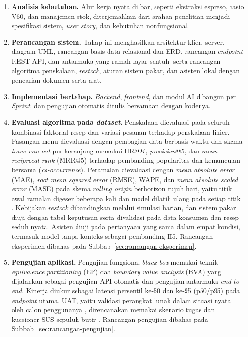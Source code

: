 \begin{enumerate}[label=\arabic*.]
\item \textbf{Analisis kebutuhan.} Alur kerja nyata di bar, seperti ekstraksi espreso, rasio V60, dan manajemen stok, diterjemahkan dari arahan penelitian menjadi spesifikasi sistem, \textit{user story}, dan kebutuhan nonfungsional.
\item \textbf{Perancangan sistem.} Tahap ini menghasilkan arsitektur klien--server, diagram UML, rancangan basis data relasional dan ERD, rancangan \textit{endpoint} REST API, dan antarmuka yang ramah layar sentuh, serta rancangan algoritma penskalaan, \textit{restock}, aturan sistem pakar, dan asisten lokal dengan pencarian dokumen serta alat.
\item \textbf{Implementasi bertahap.} \textit{Backend}, \textit{frontend}, dan modul AI dibangun per \textit{Sprint}, dan pengujian otomatis ditulis bersamaan dengan kodenya.
\item \textbf{Evaluasi algoritma pada \textit{dataset}.} Penskalaan dievaluasi pada seluruh kombinasi faktorial resep dan variasi pesanan terhadap penskalaan linier. Pasangan menu dievaluasi dengan pembagian data berbasis waktu dan skema \textit{leave-one-out} per keranjang memakai HR@$K$, \textit{precision}@5, dan \textit{mean reciprocal rank} (MRR@5) terhadap pembanding popularitas dan kemunculan bersama (\textit{co-occurrence}). Peramalan dievaluasi dengan \textit{mean absolute error} (MAE), \textit{root mean squared error} (RMSE), WAPE, dan \textit{mean absolute scaled error} (MASE) pada skema \textit{rolling origin} berhorizon tujuh hari, yaitu titik awal ramalan digeser beberapa kali dan model dilatih ulang pada setiap titik \citep*{hewamalage2022forecast}. Kebijakan \textit{restock} dibandingkan melalui simulasi harian, dan sistem pakar diuji dengan tabel keputusan serta divalidasi pada data konsumen dan resep seduh nyata. Asisten diuji pada pertanyaan yang sama dalam empat kondisi, termasuk model tanpa konteks sebagai pembanding H5. Rancangan eksperimen dibahas pada Subbab~\ref{sec:rancangan-eksperimen}.
\item \textbf{Pengujian aplikasi.} Pengujian fungsional \textit{black-box} memakai teknik \textit{equivalence partitioning} (EP) dan \textit{boundary value analysis} (BVA) \citep*{myers2012art} yang dijalankan sebagai pengujian API otomatis dan pengujian antarmuka \textit{end-to-end}. Kinerja diukur sebagai latensi persentil ke-50 dan ke-95 (p50/p95) pada \textit{endpoint} utama. UAT, yaitu validasi perangkat lunak dalam situasi nyata oleh calon penggunanya \citep*{otaduy2017user}, direncanakan memakai skenario tugas dan kuesioner SUS sepuluh butir \citep*{brooke1996sus}. Rancangan pengujian dibahas pada Subbab~\ref{sec:rancangan-pengujian}.
\end{enumerate}


